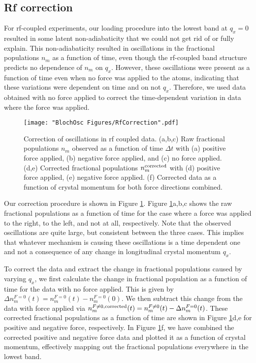 \subsection{Rf correction} \label{sec:RfCorrection}
For rf-coupled experiments, our loading procedure into the lowest band at $q_x=0$ resulted in some latent non-adiabaticity that we could not get rid of or fully explain. This non-adiabaticity resulted in oscillations in the fractional populations $n_m$ as a function of time, even though the rf-coupled band structure predicts no dependence of $n_m$ on $q_x$. However, these oscillations were present as a function of time even when no force was applied to the atoms, indicating that these variations were dependent on time and on not $q_x$. Therefore, we used data obtained with no force applied to correct the time-dependent variation in data where the force was applied.
\begin{figure}
\texttt{[image: "BlochOsc Figures/RfCorrection".pdf]}
\caption{Correction of oscillations in rf coupled data. (a,b,c) Raw fractional populations $n_m$ observed as a function of time $\Delta t$ with (a) positive force applied, (b) negative force applied, and (c) no force applied. (d,e) Corrected fractional populations $n_m^{\rm corrected}$ with (d) positive force applied, (e) negative force applied. (f) Corrected data as a function of crystal momentum for both force directions combined.  }
\label{fig:RfCorrection}
\end{figure}

Our correction procedure is shown in Figure \ref{fig:RfCorrection}.  Figure \ref{fig:RfCorrection}a,b,c shows the raw fractional populations as a function of time for the case where a force was applied to the right, to the left, and not at all, respectively. Note that the observed oscillations are quite large, but consistent between the three cases. This implies that whatever mechanism is causing these oscillations is a time dependent one and not a consequence of any change in longitudinal crystal momentum $q_x$. 

To correct the data and extract the change in fractional populations caused by varying $q_x$, we first calculate the change in fractional population as a function of time for the data with no force applied. This is given by $\Delta n_m^{F=0}(t) = n_m^{F=0}(t) - n_m^{F=0}(0)$. We then subtract this change from the data with force applied via $n_m^{F\neq0,{\rm corrected}}(t)=n_m^{F\neq0}(t)-\Delta n_m^{F=0}(t)$. These corrected fractional populations as a function of time are shown in Figure \ref{fig:RfCorrection}d,e for positive and negative force, respectively. In Figure \ref{fig:RfCorrection}f, we have combined the corrected positive and negative force data and plotted it as a function of crystal momentum, effectively mapping out the fractional populations everywhere in the lowest band. 


